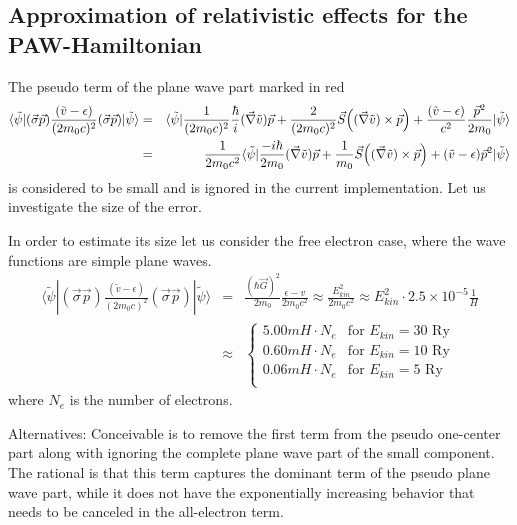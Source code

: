 \documentclass[11pt,a4paper]{report}
\begin{document}
\subsection{Approximation of relativistic effects for the PAW-Hamiltonian}
The pseudo term of the plane wave part marked in red
\begin{eqnarray}
\langle\tilde\psi|
(\vec{\sigma}\vec{p})\frac{(\tilde{v}-\epsilon)}{(2m_0c)^2}(\vec{\sigma}\vec{p})
|\tilde{\psi}\rangle &=& \langle\tilde\psi|
\frac{1}{(2m_0c)^2}\frac{\hbar}{i}(\vec{\nabla}\tilde{v})\vec{p}
+\frac{2}{(2m_0c)^2}
\vec{S}\Bigl((\vec{\nabla}\tilde{v})\times\vec{p}\Bigr)
+\frac{(\tilde{v}-\epsilon)}{c^2} \frac{\vec{p}^2}{2m_0}
|\tilde{\psi}\rangle \nonumber\\ &=&
\frac{1}{2m_0c^2}\langle\tilde\psi|
\frac{-i\hbar}{2m_0}(\vec{\nabla}\tilde{v})\vec{p} +\frac{1}{m_0}
\vec{S}\Bigl((\vec{\nabla}\tilde{v})\times\vec{p}\Bigr)
+(\tilde{v}-\epsilon)\vec{p}^2 |\tilde{\psi}\rangle
\label{eq:neglectedrelpart}
\end{eqnarray}
is considered to be small and is ignored in the current
implementation. Let us investigate the size of the error.

In order to estimate its size let us consider the free electron case,
where the wave functions are simple plane waves.
\begin{eqnarray*}
\langle\tilde\psi|
(\vec{\sigma}\vec{p})\frac{(\tilde{v}-\epsilon)}{(2m_0c)^2}(\vec{\sigma}\vec{p})
|\tilde{\psi}\rangle
&=&\frac{(\hbar\vec{G})^2}{2m_0}\frac{\epsilon-v}{2m_0c^2}
\approx \frac{E_{kin}^2}{2m_0c^2}\approx E^2_{kin} \cdot 2.5
\times10^{-5}\frac{1}{H}
\nonumber\\
&\approx&
\begin{cases}
5.00 mH\cdot N_e &\text{for $E_{kin}=30$~Ry}\\
0.60 mH\cdot N_e &\text{for $E_{kin}=10$~Ry}\\
0.06 mH\cdot N_e &\text{for $E_{kin}=5$~Ry}\\
\end{cases}
\end{eqnarray*}
where $N_e$ is the number of electrons.

Alternatives: Conceivable is to remove the first term from the pseudo
one-center part along with ignoring the complete plane wave part of
the small component. The rational is that this term captures the
dominant term of the pseudo plane wave part, while it does not have
the exponentially increasing behavior that needs to be canceled in the
all-electron term.
\end{document}
